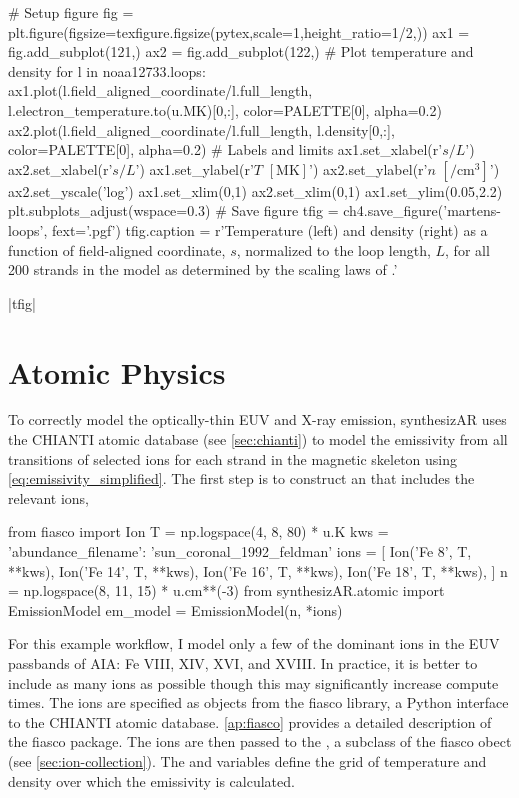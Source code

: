\begin{pycode}[chapter4]
# Setup figure
fig = plt.figure(figsize=texfigure.figsize(pytex,scale=1,height_ratio=1/2,))
ax1 = fig.add_subplot(121,)
ax2 = fig.add_subplot(122,)
# Plot temperature and density
for l in noaa12733.loops:
    ax1.plot(l.field_aligned_coordinate/l.full_length,
             l.electron_temperature.to(u.MK)[0,:],
             color=PALETTE[0], alpha=0.2)
    ax2.plot(l.field_aligned_coordinate/l.full_length,
             l.density[0,:],
             color=PALETTE[0], alpha=0.2)
# Labels and limits
ax1.set_xlabel(r'$s/L$')
ax2.set_xlabel(r'$s/L$')
ax1.set_ylabel(r'$T$ $[\si{\mega\kelvin}]$')
ax2.set_ylabel(r'$n$ $[\si{\per\cubic\cm}]$')
ax2.set_yscale('log')
ax1.set_xlim(0,1)
ax2.set_xlim(0,1)
ax1.set_ylim(0.05,2.2)
plt.subplots_adjust(wspace=0.3)
# Save figure
tfig = ch4.save_figure('martens-loops', fext='.pgf')
tfig.caption = r'Temperature (left) and density (right) as a function of field-aligned coordinate, $s$, normalized to the loop length, $L$, for all 200 strands in the model \AR{} as determined by the scaling laws of \citet{martens_scaling_2010}.'
\end{pycode}
\py[chapter4]|tfig|

\section{Atomic Physics}\label{sec:atomic-physics}


To correctly model the optically-thin EUV and X-ray emission, synthesizAR uses the CHIANTI atomic database (see \autoref{sec:chianti}) to model the emissivity from all transitions of selected ions for each strand in the magnetic skeleton using \autoref{eq:emissivity_simplified}. The first step is to construct an  that includes the relevant ions,
\begin{pyblock}[chapter4][baselinestretch=1,xleftmargin=3em]
from fiasco import Ion
T = np.logspace(4, 8, 80) * u.K
kws = { 'abundance_filename': 'sun_coronal_1992_feldman' }
ions = [
    Ion('Fe 8', T, **kws),
    Ion('Fe 14', T, **kws),
    Ion('Fe 16', T, **kws),
    Ion('Fe 18', T, **kws),
]
n = np.logspace(8, 11, 15) * u.cm**(-3)
from synthesizAR.atomic import EmissionModel
em_model = EmissionModel(n, *ions)
\end{pyblock}
For this example workflow, I model only a few of the dominant ions in the EUV passbands of AIA: Fe VIII, XIV, XVI, and XVIII. In practice, it is better to include as many ions as possible though this may significantly increase compute times. The ions are specified as  objects from the fiasco library, a Python interface to the CHIANTI atomic database. \autoref{ap:fiasco} provides a detailed description of the fiasco package. The ions are then passed to the , a subclass of the fiasco  obect (see \autoref{sec:ion-collection}). The  and  variables define the grid of temperature and density over which the emissivity is calculated.


